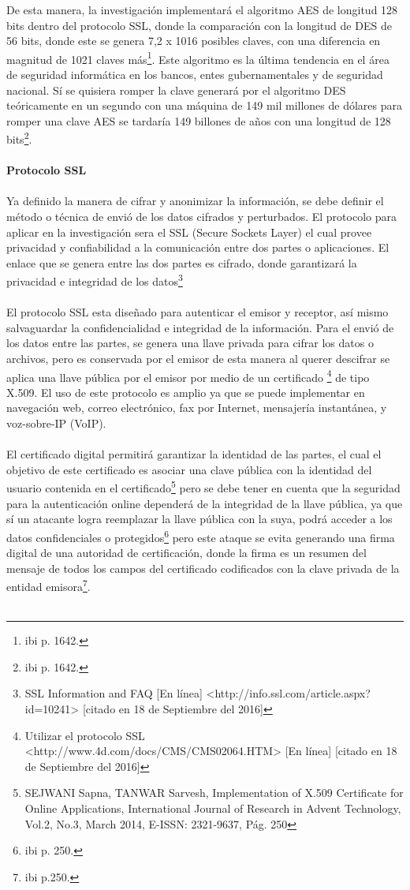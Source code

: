 \documentclass[a4paper,openright,12pt]{book}
\theoremstyle{definition}
\theoremstyle{remark}
\begin{document}
De esta manera, la investigación implementará el algoritmo AES de longitud 128 bits dentro del protocolo SSL, donde la comparación con la longitud de DES de 56 bits, donde este se genera 7,2 x 1016 posibles claves, con una diferencia en magnitud de 1021 claves más\footnote{ibi p. 1642.}. Este algoritmo es la última tendencia en el área de seguridad informática en los bancos, entes gubernamentales y de seguridad nacional. Sí se quisiera romper la clave generará por el algoritmo DES teóricamente en un segundo con una máquina de 149 mil millones de dólares para romper una clave AES se tardaría 149 billones de años con una longitud de 128 bits\footnote{ibi p. 1642.}.\\\\
\textbf{Protocolo SSL}\\\\
Ya definido la manera de cifrar y anonimizar la información, se debe definir el método o técnica de envió de los datos cifrados y perturbados. El protocolo para aplicar en la investigación sera el SSL (Secure Sockets Layer)  el cual provee privacidad y confiabilidad a la comunicación entre dos partes o aplicaciones. El enlace que se genera entre las dos partes es cifrado, donde garantizará la privacidad e integridad de los datos\footnote{ SSL Information and FAQ [En línea] <http://info.ssl.com/article.aspx?id=10241> [citado en 18 de Septiembre del 2016]}\\\\
El protocolo SSL esta diseñado para autenticar el emisor y receptor, así mismo salvaguardar la confidencialidad e integridad de la información. Para el envió de los datos entre las partes, se genera una llave privada para cifrar los datos o archivos, pero es conservada por el emisor de esta manera al querer descifrar se aplica una llave pública por el emisor por medio de un certificado \footnote{Utilizar el protocolo SSL <http://www.4d.com/docs/CMS/CMS02064.HTM> [En línea] [citado en 18 de Septiembre del 2016]} de tipo X.509. El uso de este protocolo es amplio ya que se puede implementar en  navegación web, correo electrónico, fax por Internet, mensajería instantánea, y voz-sobre-IP (VoIP).\\\\
El certificado digital permitirá garantizar la identidad de las partes, el cual el objetivo de este certificado es asociar una clave pública con la identidad del usuario contenida en el certificado\footnote{SEJWANI Sapna, TANWAR Sarvesh, Implementation of X.509 Certificate for Online Applications, International Journal of Research in Advent Technology, Vol.2, No.3, March 2014, E-ISSN: 2321-9637, Pág. 250} pero se debe tener en cuenta que la seguridad para la autenticación online dependerá de la integridad de la llave pública, ya que sí un atacante logra reemplazar la llave pública con la suya, podrá acceder a los datos confidenciales o protegidos\footnote{ibi p. 250.} pero este ataque se evita generando una firma digital de una autoridad de certificación, donde la firma es un resumen del mensaje de todos los campos del certificado codificados con la clave privada de la entidad emisora\footnote{ibi p.250.}.\\\\
\end{document}
